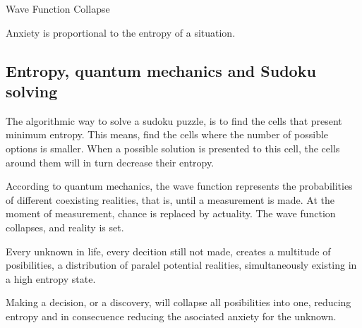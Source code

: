 
\begin{center}
\vspace*{\fill}
\Huge Wave Function Collapse

\vspace{2cm}

\begin{flushright}
\large
\textit{ \propto {}}
\end{flushright}
\vspace*{\fill}
\end{center}

\normalsize


Anxiety is proportional to the entropy of a situation. 


\subsection*{ Entropy, quantum mechanics and Sudoku solving} 

The algorithmic way to solve a sudoku puzzle, is to find the cells 
that present minimum entropy. 
This means, find the cells where the number of possible options is smaller.
When a possible solution is presented to this cell, the cells around them will 
in turn decrease their entropy. 

According to quantum mechanics, the wave function represents the probabilities 
of different coexisting realities, that is, until a 
measurement is made. At the moment of measurement, chance is replaced by 
actuality. The wave function collapses, and reality is set.

Every unknown in life, every decition still not made, creates a multitude of 
posibilities, a distribution of paralel potential realities, simultaneously 
existing in a high entropy state. 

Making a decision, or a discovery, will collapse all posibilities into one, 
reducing entropy and in consecuence reducing the asociated anxiety for the unknown. 







